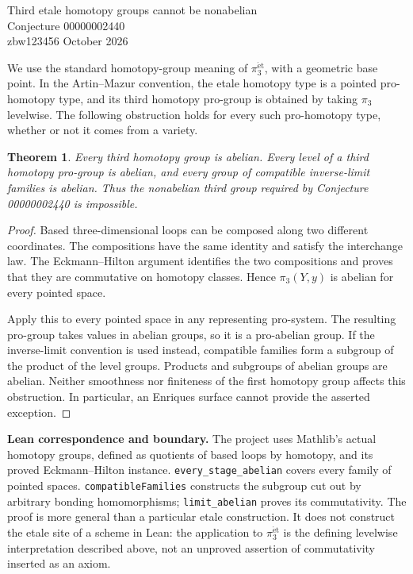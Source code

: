 \documentclass[11pt]{article}
\newtheorem{theorem}{Theorem}
\begin{document}
\begin{center}{\Large Third etale homotopy groups cannot be nonabelian}\\[5pt]{\large Conjecture 00000002440}\\[5pt]zbw123456  October 2026\end{center}

We use the standard homotopy-group meaning of $\pi_3^{\mathrm{\acute et}}$, with a geometric base point. In the Artin--Mazur convention, the etale homotopy type is a pointed pro-homotopy type, and its third homotopy pro-group is obtained by taking $\pi_3$ levelwise. The following obstruction holds for every such pro-homotopy type, whether or not it comes from a variety.
\begin{theorem}
Every third homotopy group is abelian. Every level of a third homotopy pro-group is abelian, and every group of compatible inverse-limit families is abelian. Thus the nonabelian third group required by Conjecture 00000002440 is impossible.
\end{theorem}
\begin{proof}
Based three-dimensional loops can be composed along two different coordinates. The compositions have the same identity and satisfy the interchange law. The Eckmann--Hilton argument identifies the two compositions and proves that they are commutative on homotopy classes. Hence $\pi_3(Y,y)$ is abelian for every pointed space.

Apply this to every pointed space in any representing pro-system. The resulting pro-group takes values in abelian groups, so it is a pro-abelian group. If the inverse-limit convention is used instead, compatible families form a subgroup of the product of the level groups. Products and subgroups of abelian groups are abelian. Neither smoothness nor finiteness of the first homotopy group affects this obstruction. In particular, an Enriques surface cannot provide the asserted exception.
\end{proof}
\textbf{Lean correspondence and boundary.} The project uses Mathlib's actual homotopy groups, defined as quotients of based loops by homotopy, and its proved Eckmann--Hilton instance. \texttt{every\_stage\_abelian} covers every family of pointed spaces. \texttt{compatibleFamilies} constructs the subgroup cut out by arbitrary bonding homomorphisms; \texttt{limit\_abelian} proves its commutativity. The proof is more general than a particular etale construction. It does not construct the etale site of a scheme in Lean: the application to $\pi_3^{\mathrm{\acute et}}$ is the defining levelwise interpretation described above, not an unproved assertion of commutativity inserted as an axiom.
\end{document}
